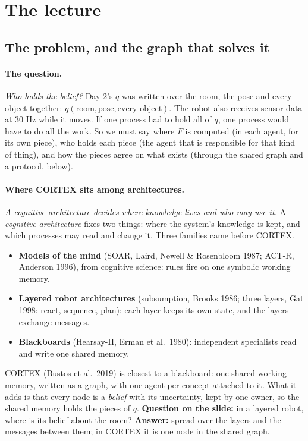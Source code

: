 \documentclass[11pt]{article}
\newcommand{\slt}[1]{\emph{#1}}   %
\begin{document}
\section{The lecture}

\subsection{The problem, and the graph that solves it}

\paragraph{The question.} \slt{Who holds the belief?} Day 2's $q$ was written over the room, the pose and every object together: $q(\text{room},\text{pose},\text{every object})$. The robot also receives sensor data at 30 Hz while it moves. If one process had to hold all of $q$, one process would have to do all the work. So we must say where $F$ is computed (in each agent, for its own piece), who holds each piece (the agent that is responsible for that kind of thing), and how the pieces agree on what exists (through the shared graph and a protocol, below).

\paragraph{Where CORTEX sits among architectures.} \slt{A cognitive architecture decides where knowledge lives and who may use it.} A \emph{cognitive architecture} fixes two things: where the system's knowledge is kept, and which processes may read and change it. Three families came before CORTEX.
\begin{itemize}[nosep]
  \item \textbf{Models of the mind} (SOAR, Laird, Newell \& Rosenbloom 1987; ACT-R, Anderson 1996), from cognitive science: rules fire on one symbolic working memory.
  \item \textbf{Layered robot architectures} (subsumption, Brooks 1986; three layers, Gat 1998: react, sequence, plan): each layer keeps its own state, and the layers exchange messages.
  \item \textbf{Blackboards} (Hearsay-II, Erman et al.\ 1980): independent specialists read and write one shared memory.
\end{itemize}
CORTEX (Bustos et al.\ 2019) is closest to a blackboard: one shared working memory, written as a graph, with one agent per concept attached to it. What it adds is that every node is a \emph{belief} with its uncertainty, kept by one owner, so the shared memory holds the pieces of $q$. \textbf{Question on the slide:} in a layered robot, where is its belief about the room? \textbf{Answer:} spread over the layers and the messages between them; in CORTEX it is one node in the shared graph.
\end{document}
